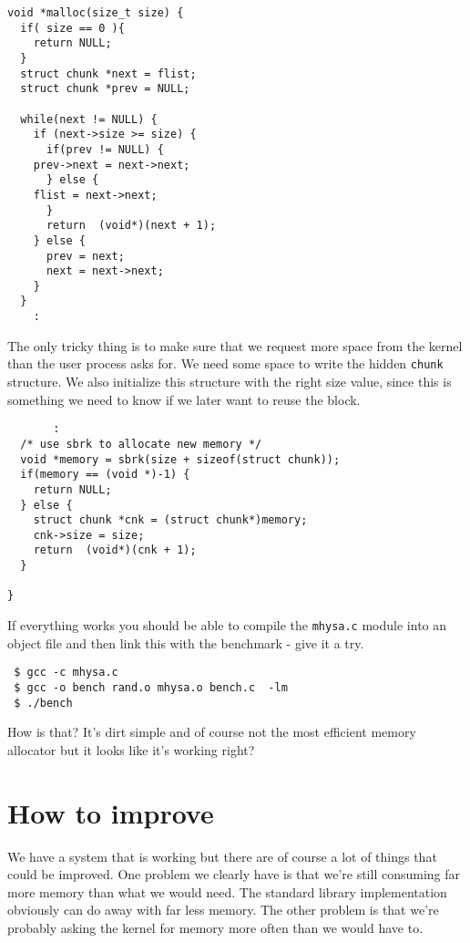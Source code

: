 \documentclass[a4paper,11pt]{article}
\begin{document}
\begin{lstlisting}
void *malloc(size_t size) {
  if( size == 0 ){
    return NULL;
  }
  struct chunk *next = flist;
  struct chunk *prev = NULL;

  while(next != NULL) {
    if (next->size >= size) {
      if(prev != NULL) {
	prev->next = next->next;
      } else {
	flist = next->next;
      }
      return  (void*)(next + 1);
    } else {
      prev = next;
      next = next->next;
    }
  }
    :
\end{lstlisting}

The only tricky thing is to make sure that we request more space from
the kernel than the user process asks for. We need some space to write
the hidden {\tt chunk} structure.  We also initialize this structure
with the right size value, since this is something we need to know if
we later want to reuse the block.

\begin{lstlisting}
       :
  /* use sbrk to allocate new memory */
  void *memory = sbrk(size + sizeof(struct chunk));
  if(memory == (void *)-1) {
    return NULL;
  } else {
    struct chunk *cnk = (struct chunk*)memory;
    cnk->size = size;
    return  (void*)(cnk + 1);
  } 
	  
}
\end{lstlisting}

If everything works you should be able to compile the {\tt mhysa.c}
module into an object file and then link this with the benchmark -
give it a try.

\begin{verbatim}
 $ gcc -c mhysa.c
 $ gcc -o bench rand.o mhysa.o bench.c  -lm
 $ ./bench
\end{verbatim}

How is that? It's dirt simple and of course not the most efficient
memory allocator but it looks like it's working right?

\section{How to improve}

We have a system that is working but there are of course a lot of
things that could be improved. One problem we clearly have is that
we're still consuming far more memory than what we would need. The
standard library implementation obviously can do away with far less
memory. The other problem is that we're probably asking the kernel for
 memory more often than we would have to.
\end{document}
